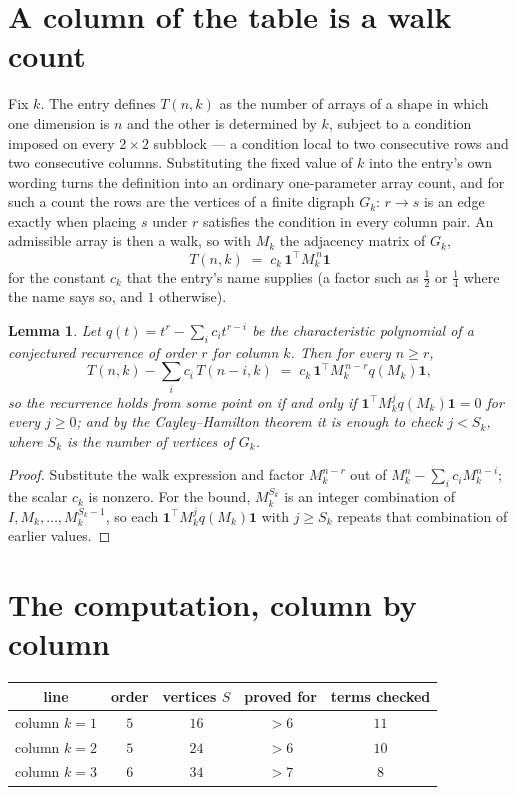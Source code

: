 \documentclass[11pt,a4paper]{article}
\theoremstyle{plain}
\newtheorem{lemma}[theorem]{Lemma}
\theoremstyle{definition}
\begin{document}
\section{A column of the table is a walk count}

Fix $k$. The entry defines $T(n,k)$ as the number of arrays of a shape in which one dimension
is $n$ and the other is determined by $k$, subject to a condition imposed on every
$2\times2$ subblock --- a condition local to two consecutive rows and two consecutive columns.
Substituting the fixed value of $k$ into the entry's own wording turns the definition into an
ordinary one-parameter array count, and for such a count the rows are the vertices of a finite
digraph $G_k$: $r\to s$ is an edge exactly when placing $s$ under $r$ satisfies the condition
in every column pair. An admissible array is then a walk, so with $M_k$ the adjacency matrix
of $G_k$,
\[
T(n,k)\;=\;c_k\,\mathbf{1}^{\!\top}M_k^{\,n}\mathbf{1}
\]
for the constant $c_k$ that the entry's name supplies (a factor such as $\tfrac12$ or
$\tfrac14$ where the name says so, and $1$ otherwise).

\begin{lemma}\label{lem:crit}
Let $q(t)=t^{r}-\sum_i c_it^{r-i}$ be the characteristic polynomial of a conjectured
recurrence of order $r$ for column $k$. Then for every $n\ge r$,
\[
T(n,k)-\sum_i c_i\,T(n-i,k)\;=\;c_k\,\mathbf{1}^{\!\top}M_k^{\,n-r}q(M_k)\mathbf{1},
\]
so the recurrence holds from some point on if and only if
$\mathbf{1}^{\!\top}M_k^{j}q(M_k)\mathbf{1}=0$ for every $j\ge0$; and by the
Cayley--Hamilton theorem it is enough to check $j<S_k$, where $S_k$ is the number of vertices
of $G_k$.
\end{lemma}

\begin{proof}
Substitute the walk expression and factor $M_k^{n-r}$ out of $M_k^{n}-\sum_ic_iM_k^{n-i}$;
the scalar $c_k$ is nonzero. For the bound, $M_k^{S_k}$ is an integer combination of
$I,M_k,\dots,M_k^{S_k-1}$, so each $\mathbf{1}^{\!\top}M_k^{j}q(M_k)\mathbf{1}$ with
$j\ge S_k$ repeats that combination of earlier values.
\end{proof}

\section{The computation, column by column}

\begin{center}
\begin{tabular}{ccccc}
line & order & vertices $S$ & proved for & terms checked \\ \hline
column $k$$=1$ & $5$ & $16$ & $>6$ & $11$ \\
column $k$$=2$ & $5$ & $24$ & $>6$ & $10$ \\
column $k$$=3$ & $6$ & $34$ & $>7$ & $8$ \\
\end{tabular}
\end{center}
\end{document}
